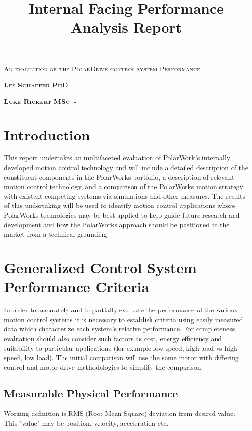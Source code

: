 \documentclass{article}
\title{Internal Facing Performance Analysis Report}
\begin{document}
\begin{titlingpage}
\maketitle
\vspace{1cm}
{\scshape\Large An evaluation of the PolarDrive control system Performance \par}
\hrulefill \par 
\vspace{15cm}
{\scshape \textbf{Les Schaffer PhD} \,\,-\,\,  \par}
{\scshape \textbf{Luke Rickert MSc} \,\,-\,\, \par}
\end{titlingpage}
\tableofcontents
\newpage
\section*{Introduction}
This report undertakes an multifaceted evaluation of PolarWork's internally developed motion control technology and will include a detailed description of the constituent components in the PolarWorks portfolio, a description of relevant motion control technology, and a comparison of the PolarWorks motion strategy with existent competing systems via simulations and other measures. The results of this undertaking will be used to identify motion control applications where PolarWorks technologies may be best applied to help guide future research and development and how the PolarWorks approach should be positioned in the market from a technical grounding. 
\section{Generalized Control System Performance Criteria}
In order to accurately and impartially evaluate the performance of the various motion control systems it is necessary to establish criteria using easily measured data which characterize each system's relative performance. For completeness evaluation should also consider such factors as cost, energy efficiency and suitability to particular applications (for example low speed, high load vs high speed, low load). The initial comparison will use the same motor with differing control and motor drive methodologies to simplify the comparison.  

\subsection{Measurable Physical Performance}
Working definition is RMS (Root Mean Square) deviation from desired value. This "value" may be position, velocity, acceleration etc. 
\end{document}
